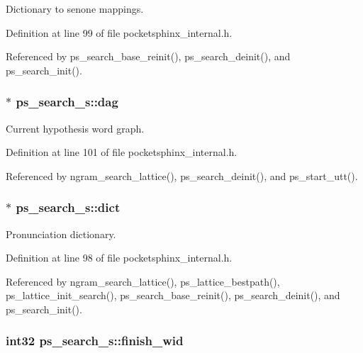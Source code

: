 Dictionary to senone mappings. 



Definition at line 99 of file pocketsphinx\-\_\-internal.\-h.



Referenced by ps\-\_\-search\-\_\-base\-\_\-reinit(), ps\-\_\-search\-\_\-deinit(), and ps\-\_\-search\-\_\-init().

\subsubsection[{dag}]{$\ast$ ps\-\_\-search\-\_\-s\-::dag}\label{structps__search__s_a897f46c55d17e817ff1364f555b31463}


Current hypothesis word graph. 



Definition at line 101 of file pocketsphinx\-\_\-internal.\-h.



Referenced by ngram\-\_\-search\-\_\-lattice(), ps\-\_\-search\-\_\-deinit(), and ps\-\_\-start\-\_\-utt().

\subsubsection[{dict}]{$\ast$ ps\-\_\-search\-\_\-s\-::dict}\label{structps__search__s_a918f243fa966e72c47f697fb9e60089d}


Pronunciation dictionary. 



Definition at line 98 of file pocketsphinx\-\_\-internal.\-h.



Referenced by ngram\-\_\-search\-\_\-lattice(), ps\-\_\-lattice\-\_\-bestpath(), ps\-\_\-lattice\-\_\-init\-\_\-search(), ps\-\_\-search\-\_\-base\-\_\-reinit(), ps\-\_\-search\-\_\-deinit(), and ps\-\_\-search\-\_\-init().

\subsubsection[{finish\-\_\-wid}]{\setlength{\rightskip}{0pt plus 5cm}int32 ps\-\_\-search\-\_\-s\-::finish\-\_\-wid}\label{structps__search__s_a0fb4d79f1084bdbbc0a808513f7c1ca7}


